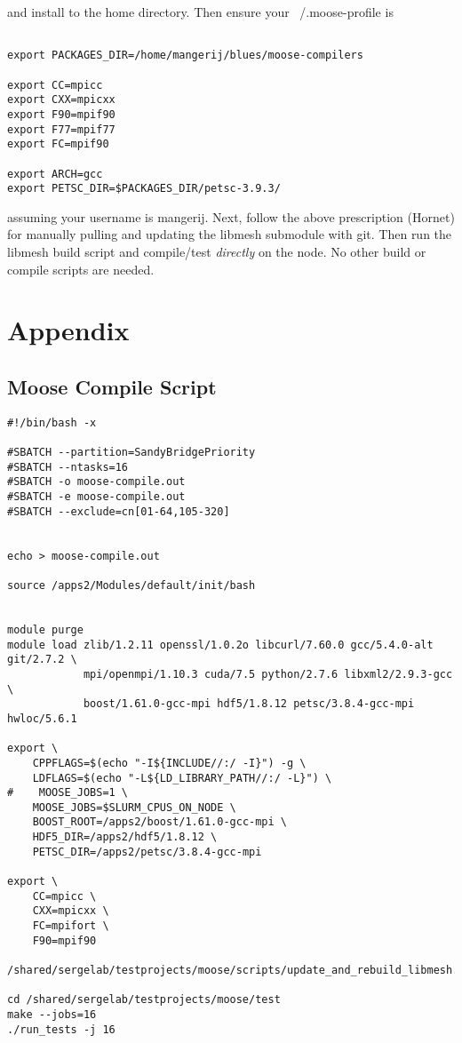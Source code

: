 \documentclass[a4paper]{article}
\begin{document}
and install to the home directory. Then ensure your ~/.moose-profile is

\begin{verbatim}

export PACKAGES_DIR=/home/mangerij/blues/moose-compilers

export CC=mpicc
export CXX=mpicxx
export F90=mpif90
export F77=mpif77
export FC=mpif90

export ARCH=gcc
export PETSC_DIR=$PACKAGES_DIR/petsc-3.9.3/

\end{verbatim}
assuming your username is mangerij. Next, follow the above prescription (Hornet) for manually pulling and updating the libmesh submodule with git. Then run the libmesh build script and compile/test \emph{directly} on the node. No other build or compile scripts are needed.

\newpage
\section{Appendix}
\subsection{Moose Compile Script}

\begin{verbatim}
#!/bin/bash -x

#SBATCH --partition=SandyBridgePriority
#SBATCH --ntasks=16
#SBATCH -o moose-compile.out
#SBATCH -e moose-compile.out
#SBATCH --exclude=cn[01-64,105-320]


echo > moose-compile.out

source /apps2/Modules/default/init/bash


module purge 
module load zlib/1.2.11 openssl/1.0.2o libcurl/7.60.0 gcc/5.4.0-alt git/2.7.2 \
            mpi/openmpi/1.10.3 cuda/7.5 python/2.7.6 libxml2/2.9.3-gcc \
            boost/1.61.0-gcc-mpi hdf5/1.8.12 petsc/3.8.4-gcc-mpi hwloc/5.6.1 

export \
    CPPFLAGS=$(echo "-I${INCLUDE//:/ -I}") -g \
    LDFLAGS=$(echo "-L${LD_LIBRARY_PATH//:/ -L}") \
#    MOOSE_JOBS=1 \
    MOOSE_JOBS=$SLURM_CPUS_ON_NODE \
    BOOST_ROOT=/apps2/boost/1.61.0-gcc-mpi \
    HDF5_DIR=/apps2/hdf5/1.8.12 \
    PETSC_DIR=/apps2/petsc/3.8.4-gcc-mpi

export \
    CC=mpicc \
    CXX=mpicxx \
    FC=mpifort \
    F90=mpif90

/shared/sergelab/testprojects/moose/scripts/update_and_rebuild_libmesh.sh

cd /shared/sergelab/testprojects/moose/test
make --jobs=16
./run_tests -j 16

\end{verbatim}
\newpage
\end{document}
